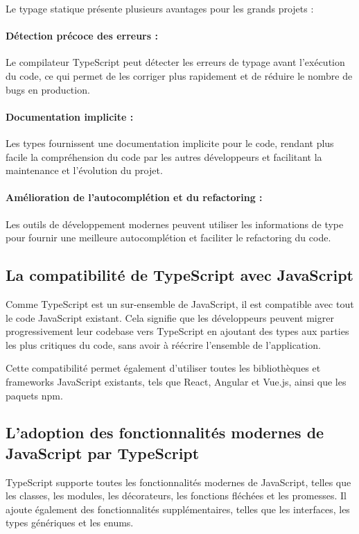 Le typage statique présente plusieurs avantages pour les grands projets :

\paragraph{Détection précoce des erreurs :} Le compilateur TypeScript peut détecter les erreurs de typage avant l'exécution du code, ce qui permet de les corriger plus rapidement et de réduire le nombre de bugs en production.
\paragraph{Documentation implicite :} Les types fournissent une documentation implicite pour le code, rendant plus facile la compréhension du code par les autres développeurs et facilitant la maintenance et l'évolution du projet.
\paragraph{Amélioration de l'autocomplétion et du refactoring :} Les outils de développement modernes peuvent utiliser les informations de type pour fournir une meilleure autocomplétion et faciliter le refactoring du code.

\subsection{La compatibilité de TypeScript avec JavaScript}

Comme TypeScript est un sur-ensemble de JavaScript, il est compatible avec tout le code JavaScript existant. Cela signifie que les développeurs peuvent migrer progressivement leur codebase vers TypeScript en ajoutant des types aux parties les plus critiques du code, sans avoir à réécrire l'ensemble de l'application.

Cette compatibilité permet également d'utiliser toutes les bibliothèques et frameworks JavaScript existants, tels que React, Angular et Vue.js, ainsi que les paquets npm.

\subsection{L'adoption des fonctionnalités modernes de JavaScript par TypeScript}

TypeScript supporte toutes les fonctionnalités modernes de JavaScript, telles que les classes, les modules, les décorateurs, les fonctions fléchées et les promesses. Il ajoute également des fonctionnalités supplémentaires, telles que les interfaces, les types génériques et les enums.

